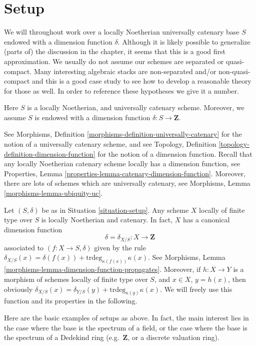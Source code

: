 \section{Setup}
\label{section-setup}

\noindent
We will throughout work over a locally Noetherian universally
catenary base $S$ endowed with a dimension function $\delta$.
Although it is likely possible to generalize (parts of) the
discussion in the chapter, it seems that this is a good first
approximation. We usually do not assume our schemes are
separated or quasi-compact. Many interesting algebraic stacks
are non-separated and/or non-quasi-compact and this is a good
case study to see how to develop a reasonable theory for those as well.
In order to reference these hypotheses we give it a number.

\begin{situation}
\label{situation-setup}
Here $S$ is a locally Noetherian, and universally catenary scheme.
Moreover, we assume $S$ is endowed with a dimension function
$\delta : S \longrightarrow \mathbf{Z}$.
\end{situation}

\noindent
See Morphisms, Definition \ref{morphisms-definition-universally-catenary}
for the notion of a universally catenary scheme, and see
Topology, Definition \ref{topology-definition-dimension-function}
for the notion of a dimension function. Recall that any locally
Noetherian catenary scheme locally has a dimension function, see
Properties, Lemma \ref{properties-lemma-catenary-dimension-function}.
Moreover, there are lots of schemes which are universally catenary,
see Morphisms, Lemma \ref{morphisms-lemma-ubiquity-uc}.

\medskip\noindent
Let $(S, \delta)$ be as in Situation \ref{situation-setup}.
Any scheme $X$ locally of finite type over $S$ is locally Noetherian
and catenary. In fact, $X$ has a canonical dimension function
$$
\delta = \delta_{X/S} : X \longrightarrow \mathbf{Z}
$$
associated to $(f : X \to S, \delta)$ given by the rule
$\delta_{X/S}(x) = \delta(f(x)) + \text{trdeg}_{\kappa(f(x))}\kappa(x)$.
See Morphisms, Lemma \ref{morphisms-lemma-dimension-function-propagates}.
Moreover, if $h : X \to Y$ is a morphism of schemes locally of finite
type over $S$, and $x \in X$, $y = h(x)$,
then obviously
$\delta_{X/S}(x) = \delta_{Y/S}(y) + \text{trdeg}_{\kappa(y)}\kappa(x)$.
We will freely use this function and its properties in the following.

\medskip\noindent
Here are the basic examples of setups as above.
In fact, the main interest lies in the case where the base
is the spectrum of a field, or the case where the base
is the spectrum of a Dedekind ring (e.g.\ $\mathbf{Z}$,
or a discrete valuation ring).

